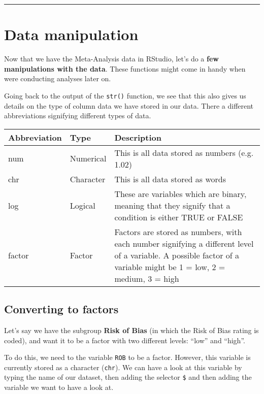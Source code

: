 \documentclass[]{book}
\theoremstyle{definition}
\theoremstyle{definition}
\theoremstyle{definition}
\theoremstyle{remark}
\begin{document}
\begin{center}\rule{0.5\linewidth}{\linethickness}\end{center}

\section{Data manipulation}\label{data-manipulation}

Now that we have the Meta-Analysis data in RStudio, let's do a
\textbf{few manipulations with the data}. These functions might come in
handy when were conducting analyses later on.

Going back to the output of the \texttt{str()} function, we see that
this also gives us details on the type of column data we have stored in
our data. There a different abbreviations signifying different types of
data.

\begin{tabular}{l|l|l}
\hline
Abbreviation & Type & Description\\
\hline
num & Numerical & This is all data stored as numbers (e.g. 1.02)\\
\hline
chr & Character & This is all data stored as words\\
\hline
log & Logical & These are variables which are binary, meaning that they signify that a condition is either TRUE or FALSE\\
\hline
factor & Factor & Factors are stored as numbers, with each number signifying a different level of a variable. A possible factor of a variable might be 1 = low, 2 = medium, 3 = high\\
\hline
\end{tabular}

\hypertarget{convertfactors}{\subsection{Converting to
factors}\label{convertfactors}}

Let's say we have the subgroup \textbf{Risk of Bias} (in which the Risk
of Bias rating is coded), and want it to be a factor with two different
levels: ``low'' and ``high''.

To do this, we need to the variable \texttt{ROB} to be a factor.
However, this variable is currently stored as a character
(\texttt{chr}). We can have a look at this variable by typing the name
of our dataset, then adding the selector \texttt{\$} and then adding the
variable we want to have a look at.
\end{document}
